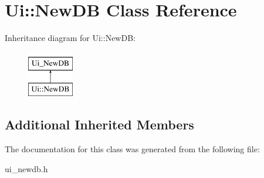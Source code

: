 \hypertarget{classUi_1_1NewDB}{\section{Ui\-:\-:New\-D\-B Class Reference}
\label{classUi_1_1NewDB}
}
Inheritance diagram for Ui\-:\-:New\-D\-B\-:\begin{figure}[H]
\begin{center}
\leavevmode
\includegraphics[height=2.000000cm]{classUi_1_1NewDB}
\end{center}
\end{figure}
\subsection*{Additional Inherited Members}


The documentation for this class was generated from the following file\-:\begin{DoxyCompactItemize}
\item 
ui\-\_\-newdb.\-h\end{DoxyCompactItemize}
